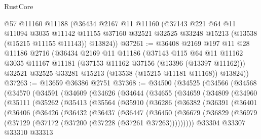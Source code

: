 \begin{lexlean}{RustCore}
\begin{coremodule}
    @57
    @11160
    @11188
    (@36434
      @2167
      @11
      @11160
      (@37143
        @221
        @64
        @11
        @11094
        @3035
        @11142
        @11155
        @37160
        @32521
        @32525
        @33248
        @15213
        (@13538 (@15215 @11155 @11143))
        @13824))
@37261 := @36408
    @2169
    @197
    @11
    @28
    @11186
    @2716
    (@36434
      @2169
      @11
      @11186
      (@37143
        @115
        @64
        @11
        @11162
        @3035
        @11167
        @11181
        (@37153 @11162 @37156 (@13396 (@13397 @11162)))
        @32521
        @32525
        @33281
        @15213
        (@13538 (@15215 @11181 @11168))
        @13824))
@37263 := @13659 @36386 @2751
@37368 := @34500
    (@34525
      (@34566
        (@34568
          (@34570
            (@34591
              (@34609
                (@34626
                  (@34644
                    (@34655
                      (@34659
                        (@34809
                          (@34960
                            (@35111
                              (@35262
                                (@35413
                                  (@35564
                                    (@35910
                                      (@36286
                                        (@36382
                                          (@36391
                                            (@36401
                                              (@36406
                                                (@36426
                                                  (@36432
                                                    (@36437
                                                      (@36447
                                                        (@36450
                                                          (@36679
                                                            (@36829
                                                              (@36979
                                                                (@37129
                                                                  (@37172
                                                                    (@37200
                                                                      (@37228
                                                                        (@37261 @37263)))))))))
                                                        @33304
                                                        @33307
                                                        @33310
                                                        @33313

\end{coremodule}
\end{lexlean}
